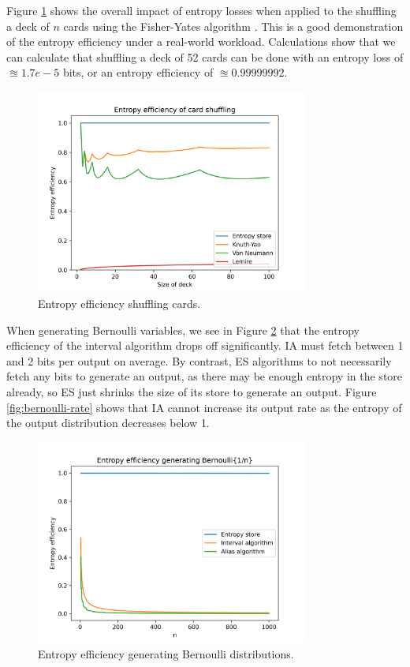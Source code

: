\documentclass[12pt]{article}
\begin{document}
Figure \ref{fig:shuffling-efficiency} shows the overall impact of entropy losses when applied to the shuffling a deck of $n$ cards using the Fisher-Yates algorithm \cite{fisher1953statistical, durstenfeld1964algorithm, knuth2014art}. This is a good demonstration of the entropy efficiency under a real-world workload. Calculations show that we can calculate that shuffling a deck of 52 cards can be done with an entropy loss of $\approxeq 1.7e-5$ bits, or an entropy efficiency of $\approxeq 0.99999992$.

\begin{figure}[ht]
\centering
\includegraphics[width=0.8\textwidth]{shuffling_efficiency.png}
\caption{Entropy efficiency shuffling cards.}
\label{fig:shuffling-efficiency}
\end{figure}

When generating Bernoulli variables, we see in Figure \ref{fig:bernoulli-efficiency} that the entropy efficiency of the interval algorithm drops off significantly. IA must fetch between 1 and 2 bits per output on average. By contrast, ES algorithms to not necessarily fetch any bits to generate an output, as there may be enough entropy in the store already, so ES just shrinks the size of its store to generate an output. Figure \ref{fig:bernoulli-rate} shows that IA cannot increase its output rate as the entropy of the output distribution decreases below 1.

\begin{figure}[ht]
\centering
\includegraphics[width=0.8\textwidth]{bernoulli_efficiency.png}
\caption{Entropy efficiency generating Bernoulli distributions.}
\label{fig:bernoulli-efficiency}
\end{figure}
\end{document}

